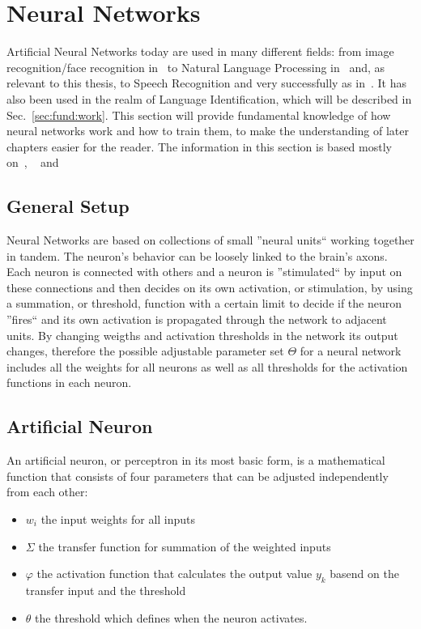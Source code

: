 \section{Neural Networks}
\label{sec:fund:NN}
Artificial Neural Networks today are used in many different fields: from image recognition/face recognition in~\cite{lawrence1997face} to Natural Language Processing in~\cite{collobert2008unified} and, as relevant to this thesis, to Speech Recognition and very successfully as in~\cite{hinton2012deep}. It has also been used in the realm of Language Identification, which will be described in Sec.~\ref{sec:fund:work}. This section will provide fundamental knowledge of how neural networks work and how to train them, to make the understanding of later chapters easier for the reader. The information in this section is based mostly on~\cite{haykin2004comprehensive}, ~\cite{Goodfellow-et-al-2016} and~\cite{deeplearning-online}


\subsection{General Setup}
\label{sec:fund:general}
Neural Networks are based on collections of small ''neural units``  working together in tandem. The neuron's behavior can be loosely linked to the brain's axons. Each neuron is connected with others and a neuron is ''stimulated`` by input on these connections and then decides on its own activation, or stimulation, by using a summation, or threshold, function with a certain limit to decide if the neuron ''fires`` and its own activation is propagated through the network to adjacent units. By changing weigths and activation thresholds in the network its output changes, therefore the possible adjustable parameter set \(\Theta\) for a neural network includes all the weights for all neurons as well as all thresholds for the activation functions in each neuron.

\subsection{Artificial Neuron}
\label{sec:fund:AN}

An artificial neuron, or perceptron in its most basic form, is a mathematical function that consists of four parameters that can be adjusted independently from each other:
\begin{itemize}
\item \(w_i\) the input weights for all inputs
\item \(\Sigma\) the transfer function for summation of the weighted inputs
\item \(\varphi\) the activation function that calculates the output value \(y_k\) basend on the transfer input and the threshold
\item \(\theta\) the threshold which defines when the neuron activates.
\end{itemize}

